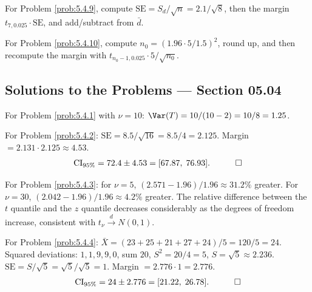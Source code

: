 \begin{sugerencia}
	\label{sug:5.4.9}
	For Problem \ref{prob:5.4.9}, compute $\text{SE}=S_d/\sqrt n = 2.1/\sqrt 8$, then the margin $t_{7,0.025}\cdot\text{SE}$, and add/subtract from $\bar d$.
\end{sugerencia}

\begin{sugerencia}
	\label{sug:5.4.10}
	For Problem \ref{prob:5.4.10}, compute $n_0=(1.96\cdot 5/1.5)^2$, round up, and then recompute the margin with $t_{n_0-1,0.025}\cdot 5/\sqrt{n_0}$.
\end{sugerencia}

\subsection*{Solutions to the Problems --- Section 05.04}

\begin{solucion}
	\label{sol:5.4.1}
	For Problem \ref{prob:5.4.1} with $\nu=10$: $\Var(T) = 10/(10-2) = 10/8 = 1.25$. \quad \qedhere
\end{solucion}

\begin{solucion}
	\label{sol:5.4.2}
	For Problem \ref{prob:5.4.2}: $\text{SE}=8.5/\sqrt{16}=8.5/4=2.125$. Margin $=2.131\cdot 2.125\approx 4.53$.
	\begin{align*}
		\text{CI}_{95\%} = 72.4 \pm 4.53 = [67.87,\; 76.93]. \quad \qedhere
	\end{align*}
\end{solucion}

\begin{solucion}
	\label{sol:5.4.3}
	For Problem \ref{prob:5.4.3}: for $\nu=5$, $(2.571-1.96)/1.96 \approx 31.2\%$ greater. For $\nu=30$, $(2.042-1.96)/1.96\approx 4.2\%$ greater. The relative difference between the $t$ quantile and the $z$ quantile decreases considerably as the degrees of freedom increase, consistent with $t_\nu\xrightarrow{d}N(0,1)$. \quad \qedhere
\end{solucion}

\begin{solucion}
	\label{sol:5.4.4}
	For Problem \ref{prob:5.4.4}: $\bar X = (23+25+21+27+24)/5 = 120/5 = 24$. Squared deviations: $1,1,9,9,0$, sum $20$, $S^2=20/4=5$, $S=\sqrt5\approx 2.236$. $\text{SE}=S/\sqrt5 = \sqrt5/\sqrt5=1$. Margin $=2.776\cdot 1=2.776$.
	\begin{align*}
		\text{CI}_{95\%} = 24 \pm 2.776 = [21.22,\; 26.78]. \quad \qedhere
	\end{align*}
\end{solucion}

